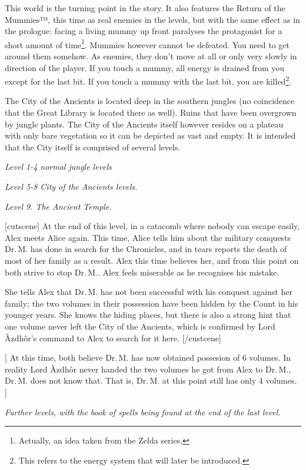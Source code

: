 \documentclass{gd-document}
\newcommand\DrM{Dr.\,M.\xspace}
\newcommand\Azdhor{Lord Àzdhôr\xspace}
\newcommand\level[1]{\textit{#1}}
\begin{document}
This world is the turning point in the story. It also features the
Return of the Mummies™, this time as real enemies in the levels, but
with the same effect as in the prologue: facing a living mummy up
front paralyses the protagonist for a short amount of
time\footnote{Actually, an idea taken from the Zelda series.}. Mummies
however cannot be defeated. You need to get around them somehow. As
enemies, they don’t move at all or only very slowly in direction of
the player. If you touch a mummy, all energy is drained from you
except for the last bit. If you touch a mummy with the last bit, you
are killed\footnote{This refers to the energy system that will later
  be introduced.}.

The City of the Ancients is located deep in the southern jungles (no
coincidence that the Great Library is located there as well). Ruins
that have been overgrown by jungle plants. The City of the Ancients
itself however resides on a plateau with only bare vegetation so it
can be depicted as vast and empty. It is intended that the City itself
is comprised of several levels.

\level{Level 1-4 normal jungle levels}

\level{Level 5-8 City of the Ancients levels.}

\level{Level 9. The Ancient Temple.}

[cutscene]
At the end of this level, in a catacomb where nobody can
escape easily, Alex meets Alice again. This time, Alice tells him about
the military conquests \DrM has done in search for the Chronicles, and
in tears reports the death of most of her family as a result. Alex
this time believes her, and from this point on both strive to stop
\DrM. Alex feels miserable as he recognises his mistake.

She tells Alex that \DrM has not been successful with his conquest
against her family; the two volumes in their possession have been
hidden by the Count in his younger years. She knows the hiding places,
but there is also a strong hint that one volume never left the City of
the Ancients, which is confirmed by \Azdhor{}’s command to Alex to
search for it here.
[/custcene]

[ At this time, both believe \DrM has now obtained possesion of 6
volumes. In reality \Azdhor never handed the two volumes he got from
Alex to \DrM, \DrM does not know that. That is, \DrM at this point
still has only 4 volumes. ]

\level{Further levels, with the book of spells being found at the end of
  the last level.}
\end{document}
